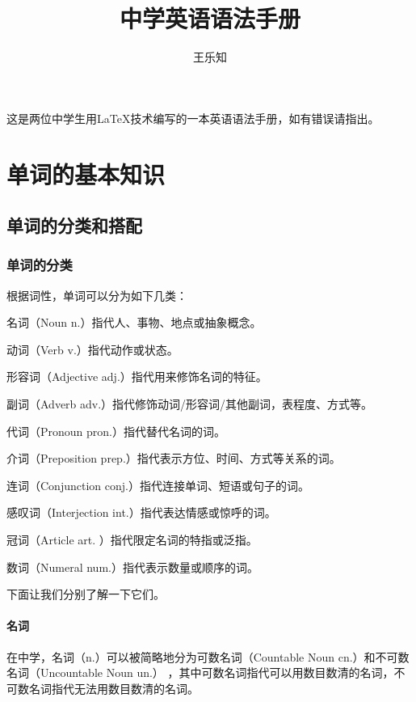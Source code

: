 \documentclass[UTF8]{ctexbook}
\title{中学英语语法手册}
\author{王乐知\and徐晨曦}
\date{}
\begin{document}
\maketitle

\begin{center}

{}

\end{center}

这是两位中学生用\LaTeX{}技术编写的一本英语语法手册，如有错误请指出。

\tableofcontents

\part{单词的基本知识}

\chapter{单词的分类和搭配}

\section{单词的分类}

根据词性，单词可以分为如下几类：

名词（Noun n.）指代人、事物、地点或抽象概念。

动词（Verb v.）指代动作或状态。

形容词（Adjective adj.）指代用来修饰名词的特征。

副词（Adverb adv.）指代修饰动词/形容词/其他副词，表程度、方式等。

代词（Pronoun pron.）指代替代名词的词。

介词（Preposition prep.）指代表示方位、时间、方式等关系的词。

连词（Conjunction conj.）指代连接单词、短语或句子的词。

感叹词（Interjection int.）指代表达情感或惊呼的词。

冠词（Article art. ）指代限定名词的特指或泛指。

数词（Numeral num.）指代表示数量或顺序的词。

下面让我们分别了解一下它们。

\subsection{名词}

在中学，名词（n.）可以被简略地分为可数名词（Countable Noun cn.）和不可数名词（Uncountable Noun un.）
，其中可数名词指代可以用数目数清的名词，不可数名词指代无法用数目数清的名词。
\end{document}

